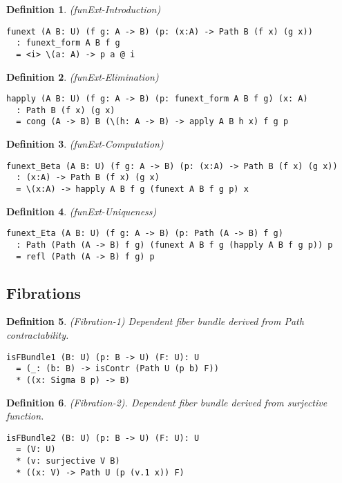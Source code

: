 \documentclass{article}
\newtheorem{definition}{Definition}
\begin{document}
\begin{definition} (funExt-Introduction)
\begin{lstlisting}
funext (A B: U) (f g: A -> B) (p: (x:A) -> Path B (f x) (g x))
  : funext_form A B f g
  = <i> \(a: A) -> p a @ i
\end{lstlisting}
\end{definition}

\begin{definition} (funExt-Elimination)
\begin{lstlisting}
happly (A B: U) (f g: A -> B) (p: funext_form A B f g) (x: A)
  : Path B (f x) (g x)
  = cong (A -> B) B (\(h: A -> B) -> apply A B h x) f g p
\end{lstlisting}
\end{definition}

\begin{definition} (funExt-Computation)
\begin{lstlisting}
funext_Beta (A B: U) (f g: A -> B) (p: (x:A) -> Path B (f x) (g x))
  : (x:A) -> Path B (f x) (g x)
  = \(x:A) -> happly A B f g (funext A B f g p) x
\end{lstlisting}
\end{definition}

\begin{definition} (funExt-Uniqueness)
\begin{lstlisting}
funext_Eta (A B: U) (f g: A -> B) (p: Path (A -> B) f g)
  : Path (Path (A -> B) f g) (funext A B f g (happly A B f g p)) p
  = refl (Path (A -> B) f g) p
\end{lstlisting}
\end{definition}

\newpage
\subsection{Fibrations}

\begin{definition} (Fibration-1) Dependent fiber bundle derived from Path contractability.
\begin{lstlisting}
isFBundle1 (B: U) (p: B -> U) (F: U): U
  = (_: (b: B) -> isContr (Path U (p b) F))
  * ((x: Sigma B p) -> B)
\end{lstlisting}
\end{definition}

\begin{definition} (Fibration-2). Dependent fiber bundle derived from surjective function.
\begin{lstlisting}
isFBundle2 (B: U) (p: B -> U) (F: U): U
  = (V: U)
  * (v: surjective V B)
  * ((x: V) -> Path U (p (v.1 x)) F)
\end{lstlisting}
\end{definition}
\end{document}
